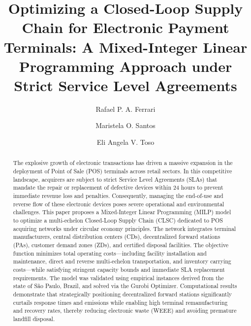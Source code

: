 \documentclass[preprint,12pt,authoryear]{elsarticle}
\begin{document}
\begin{frontmatter}

\title{Optimizing a Closed-Loop Supply Chain for Electronic Payment Terminals: A Mixed-Integer Linear Programming Approach under Strict Service Level Agreements}

\author[icmc]{Rafael P. A. Ferrari}

\author[icmc]{Maristela O. Santos}

\author[ufscar]{Eli Angela V. Toso}



\begin{abstract}
The explosive growth of electronic transactions has driven a massive expansion in the deployment of Point of Sale (POS) terminals across retail sectors. In this competitive landscape, acquirers are subject to strict Service Level Agreements (SLAs) that mandate the repair or replacement of defective devices within 24 hours to prevent immediate revenue loss and penalties. Consequently, managing the end-of-use and reverse flow of these electronic devices poses severe operational and environmental challenges. This paper proposes a Mixed-Integer Linear Programming (MILP) model to optimize a multi-echelon Closed-Loop Supply Chain (CLSC) dedicated to POS acquiring networks under circular economy principles. The network integrates terminal manufacturers, central distribution centers (CDs), decentralized forward stations (PAs), customer demand zones (ZDs), and certified disposal facilities. The objective function minimizes total operating costs---including facility installation and maintenance, direct and reverse multi-echelon transportation, and inventory carrying costs---while satisfying stringent capacity bounds and immediate SLA replacement requirements. The model was validated using empirical instances derived from the state of S\~ao Paulo, Brazil, and solved via the Gurobi Optimizer. Computational results demonstrate that strategically positioning decentralized forward stations significantly curtails response times and emissions while enabling high terminal remanufacturing and recovery rates, thereby reducing electronic waste (WEEE) and avoiding premature landfill disposal.
\end{abstract}


\end{frontmatter}
\end{document}
